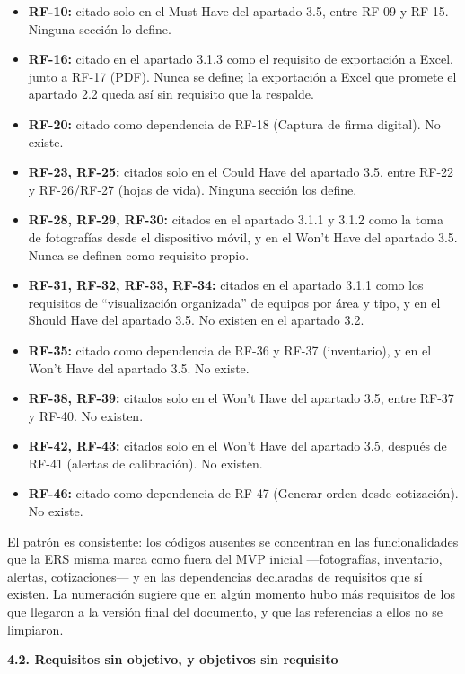 \documentclass[12pt,varwidth=170mm,border=10pt]{standalone}
\newcommand{\subsectiontitle}[1]{%
  \par\vspace{1.3ex}%
  {\normalfont\large\bfseries #1\par}%
  \vspace{0.5ex}%
}
\begin{document}
\begin{itemize}
  \item \textbf{RF-10:} citado solo en el Must Have del apartado 3.5, entre RF-09 y RF-15. Ninguna sección lo define.
  \item \textbf{RF-16:} citado en el apartado 3.1.3 como el requisito de exportación a Excel, junto a RF-17 (PDF). Nunca se define; la exportación a Excel que promete el apartado 2.2 queda así sin requisito que la respalde.
  \item \textbf{RF-20:} citado como dependencia de RF-18 (Captura de firma digital). No existe.
  \item \textbf{RF-23, RF-25:} citados solo en el Could Have del apartado 3.5, entre RF-22 y RF-26/RF-27 (hojas de vida). Ninguna sección los define.
  \item \textbf{RF-28, RF-29, RF-30:} citados en el apartado 3.1.1 y 3.1.2 como la toma de fotografías desde el dispositivo móvil, y en el Won't Have del apartado 3.5. Nunca se definen como requisito propio.
  \item \textbf{RF-31, RF-32, RF-33, RF-34:} citados en el apartado 3.1.1 como los requisitos de ``visualización organizada'' de equipos por área y tipo, y en el Should Have del apartado 3.5. No existen en el apartado 3.2.
  \item \textbf{RF-35:} citado como dependencia de RF-36 y RF-37 (inventario), y en el Won't Have del apartado 3.5. No existe.
  \item \textbf{RF-38, RF-39:} citados solo en el Won't Have del apartado 3.5, entre RF-37 y RF-40. No existen.
  \item \textbf{RF-42, RF-43:} citados solo en el Won't Have del apartado 3.5, después de RF-41 (alertas de calibración). No existen.
  \item \textbf{RF-46:} citado como dependencia de RF-47 (Generar orden desde cotización). No existe.
\end{itemize}

El patrón es consistente: los códigos ausentes se concentran en las funcionalidades que la ERS misma marca como fuera del MVP inicial —fotografías, inventario, alertas, cotizaciones— y en las dependencias declaradas de requisitos que sí existen. La numeración sugiere que en algún momento hubo más requisitos de los que llegaron a la versión final del documento, y que las referencias a ellos no se limpiaron.

\subsectiontitle{4.2. Requisitos sin objetivo, y objetivos sin requisito}
\end{document}
